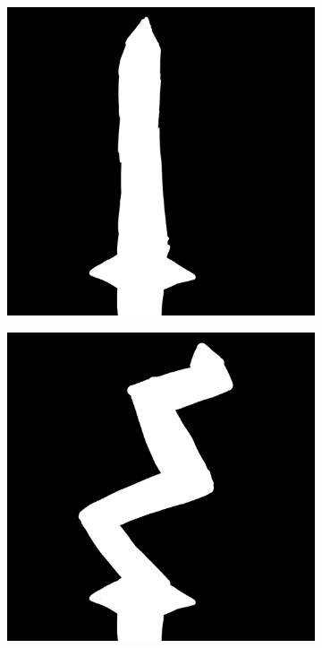 \documentclass{article}
\begin{document}
\begin{figure}[h]
    \centering
    \caption{}
    \label{fig:Iteration7}
    \begin{subfigure}{0.49\textwidth}
        \includegraphics[width=1\textwidth]{drawings/RavenousDagger1.png}
        \caption{}
        \label{fig:Iteration7.1}
    \end{subfigure}
    \begin{subfigure}{0.49\textwidth}
        \includegraphics[width=1\textwidth]{drawings/RavenousDagger2.png}
        \caption{}
        \label{fig:Iteration7.2}
    \end{subfigure}
\end{figure}
\end{document}
